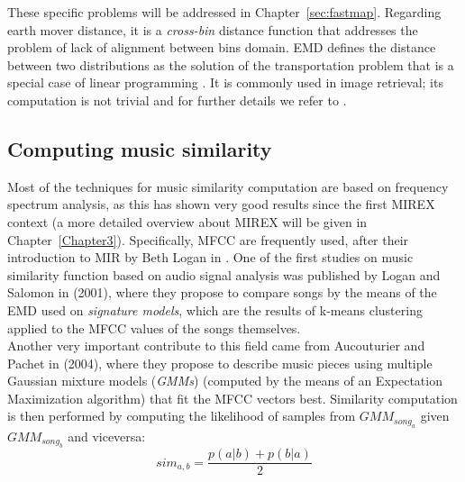 These specific problems will be addressed in Chapter~\ref{sec:fastmap}. Regarding earth mover distance, it is a \textit{cross-bin} distance function that addresses the problem of lack of alignment between bins domain.  EMD defines the distance between two distributions as the solution of the transportation problem that is a special case of linear programming \cite{ling07}. It is commonly used in image retrieval; its computation is not trivial and for further details we refer to \cite{emd}. 

\subsection*{Computing music similarity}
Most of the techniques for music similarity computation are based on frequency spectrum analysis, as this has shown very good results since the first MIREX context (a more detailed overview about MIREX will be given in Chapter~\ref{Chapter3}). Specifically, MFCC are frequently used, after their introduction to MIR by Beth Logan in \cite{logan00}. One of the first studies on music similarity function based on audio signal analysis was published by Logan and Salomon in \cite{logan01} (2001), where they propose to compare songs by the means of the EMD used on \textit{signature models}, which are the results of k-means clustering applied to the MFCC values of the songs themselves.\\ Another very important contribute to this field came from Aucouturier and Pachet in \cite{aucou02} (2004), where they propose to describe music pieces using multiple Gaussian mixture models (\textit{GMMs}) (computed by the means of an Expectation Maximization algorithm) that fit the MFCC vectors best. Similarity computation is then performed by computing the likelihood of samples from $GMM_{song_a}$ given $GMM_{song_b}$ and viceversa:
\begin{equation}
sim_{a,b} = \frac{p(a|b) + p(b|a)}{2}
\end{equation}

